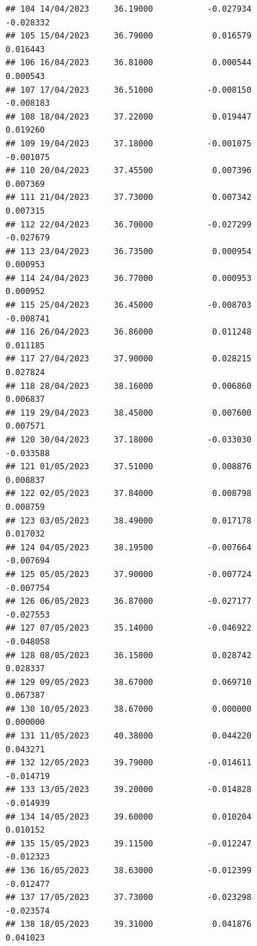 \documentclass[
]{article}
\begin{document}
\begin{verbatim}
## 104 14/04/2023     36.19000           -0.027934               -0.028332
## 105 15/04/2023     36.79000            0.016579                0.016443
## 106 16/04/2023     36.81000            0.000544                0.000543
## 107 17/04/2023     36.51000           -0.008150               -0.008183
## 108 18/04/2023     37.22000            0.019447                0.019260
## 109 19/04/2023     37.18000           -0.001075               -0.001075
## 110 20/04/2023     37.45500            0.007396                0.007369
## 111 21/04/2023     37.73000            0.007342                0.007315
## 112 22/04/2023     36.70000           -0.027299               -0.027679
## 113 23/04/2023     36.73500            0.000954                0.000953
## 114 24/04/2023     36.77000            0.000953                0.000952
## 115 25/04/2023     36.45000           -0.008703               -0.008741
## 116 26/04/2023     36.86000            0.011248                0.011185
## 117 27/04/2023     37.90000            0.028215                0.027824
## 118 28/04/2023     38.16000            0.006860                0.006837
## 119 29/04/2023     38.45000            0.007600                0.007571
## 120 30/04/2023     37.18000           -0.033030               -0.033588
## 121 01/05/2023     37.51000            0.008876                0.008837
## 122 02/05/2023     37.84000            0.008798                0.008759
## 123 03/05/2023     38.49000            0.017178                0.017032
## 124 04/05/2023     38.19500           -0.007664               -0.007694
## 125 05/05/2023     37.90000           -0.007724               -0.007754
## 126 06/05/2023     36.87000           -0.027177               -0.027553
## 127 07/05/2023     35.14000           -0.046922               -0.048058
## 128 08/05/2023     36.15000            0.028742                0.028337
## 129 09/05/2023     38.67000            0.069710                0.067387
## 130 10/05/2023     38.67000            0.000000                0.000000
## 131 11/05/2023     40.38000            0.044220                0.043271
## 132 12/05/2023     39.79000           -0.014611               -0.014719
## 133 13/05/2023     39.20000           -0.014828               -0.014939
## 134 14/05/2023     39.60000            0.010204                0.010152
## 135 15/05/2023     39.11500           -0.012247               -0.012323
## 136 16/05/2023     38.63000           -0.012399               -0.012477
## 137 17/05/2023     37.73000           -0.023298               -0.023574
## 138 18/05/2023     39.31000            0.041876                0.041023

\end{verbatim}
\end{document}
